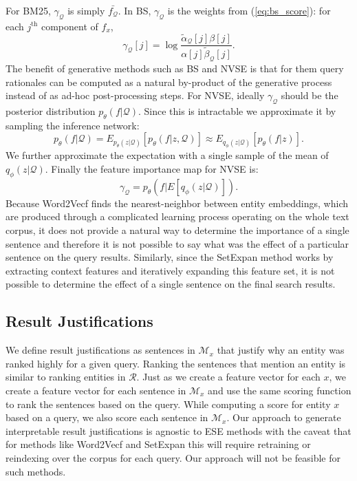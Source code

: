 \documentclass[a4paper]{article}
\newcommand{\alphat}{\tilde{\alpha}_\cQ}
\newcommand{\ath}[1]{#1^{\textrm{th}}}
\newcommand{\betat}{\tilde{\beta}_\cQ}
\newcommand{\cM}{\mathcal{M}}
\newcommand{\cQ}{\mathcal{Q}}
\newcommand{\cR}{\mathcal{R}}
\newcommand{\talpha}{\alphat}
\newcommand{\tbeta}{\betat}
\newcommand{\wTv}{Word2Vecf\xspace}
\newcommand{\setX}{SetExpan\xspace}
\newcommand{\er}{ESE\xspace}
\newcommand{\nvge}{NVSE\xspace}
\begin{document}
For BM25, $\gamma_{\cQ}$ is simply $\bar{f_{\cQ}}$. %
In BS, $\gamma_{\cQ}$ is the weights from (\ref{eq:bs_score}): %
for each  $\ath{j}$ component of $f_x$,
\begin{equation*}
\gamma_{\cQ}[j] = \log \frac{\talpha[j] \beta[j]}{\alpha[j]\tbeta[j]}. %
\end{equation*}
The benefit of generative methods such as BS and \nvge is that for them query rationales can be
computed as a natural by-product of the
generative process instead of as ad-hoc post-processing steps.
For \nvge, ideally $\gamma_{\cQ}$ should be the posterior distribution $p_\theta(f | \cQ)$.
Since this is intractable we approximate it by sampling the inference network:
\[
p_\theta(f | \cQ) = E_{p_\theta(z | \cQ)} [p_{\theta}(f | z, \cQ)]  \approx E_{q_\phi(z | \cQ)} [p_{\theta}(f|z)] .
\]
We further approximate the expectation with a single sample of the mean of $q_\phi(z | \cQ)$.
Finally the feature importance map for \nvge is:
\[\gamma_{\cQ} = p_\theta(f | E[q_\phi(z | \cQ)]).\]
Because \wTv finds the nearest-neighbor between entity embeddings, which are produced through a complicated learning process operating on the whole text corpus, it does not provide a natural way to determine the importance of a single sentence and therefore it is not possible to say what was the effect of a particular sentence on the query results. Similarly, since the \setX method works by extracting context features and iteratively expanding this feature set, it is not possible to determine the effect of a single sentence on the final search results.
\subsection{Result Justifications}
We define
result justifications as sentences in $\cM_{x}$ that justify why an
entity was ranked highly for a given query.
Ranking the sentences that mention an entity is similar to %
ranking entities in $\cR$. %
Just as we create a feature vector for each $x$,
we create a feature vector for
each sentence in $\cM_{x}$ and use the same scoring function to rank the sentences
based on the query.
While computing a score for entity $x$ based on a query,
we also score each sentence in $\cM_{x}$.
Our approach to generate interpretable result justifications is agnostic to \er methods
with the caveat that for methods like \wTv and \setX this will require retraining or reindexing over the corpus for each query. Our approach will not be feasible for such methods.
\end{document}
